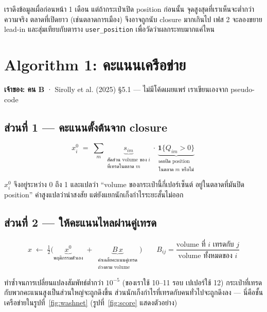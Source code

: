 \documentclass[11pt,a4paper]{article}
\newcommand{\en}[1]{#1}
\newcommand{\code}[1]{\texttt{#1}}
\newcommand{\stg}[2]{\textcolor{#1}{\textbf{\en{#2}}}}
\newcommand{\rB}{\stg{alg}{B}}
\begin{document}
\begin{warnbox}[title={ข้อจำกัดที่ต้องพูดตรง ๆ: position ก่อนหน้าต่างเวลาเราไม่รู้}]
เราดึงข้อมูลเผื่อก่อนหน้า 1 เดือน แต่ถ้ากระเป๋าเปิด position ก่อนนั้น
จุดสูงสุดที่เราเห็นจะต่ำกว่าความจริง ตลาดที่เปิดยาว (เช่นตลาดการเมือง)
จึงอาจถูกนับ closure มากเกินไป เฟส 2 จะลองขยาย lead-in
และสุ่มเทียบกับตาราง \code{user\_position} เพื่อวัดว่าผลกระทบมากแค่ไหน
\end{warnbox}

\section{Algorithm 1: คะแนนเครือข่าย}
\label{sec:alg}

\textbf{เจ้าของ: คน \rB} · Sirolly et al. (2025) §5.1 --- ไม่มีโค้ดเผยแพร่ เราเขียนเองจาก pseudo-code

\subsection{ส่วนที่ 1 --- คะแนนตั้งต้นจาก closure}

\begin{equation}
x^{0}_i \;=\; \sum_{m}
\underbrace{s_{im}}_{\substack{\text{สัดส่วน volume ของ } i\\ \text{ที่เทรดในตลาด } m}}
\cdot
\underbrace{\mathbf{1}\{Q_{im} > 0\}}_{\substack{\text{เคยปิด position}\\ \text{ในตลาด } m \text{ หรือไม่}}}
\end{equation}

$x^0_i$ จึงอยู่ระหว่าง 0 ถึง 1 และแปลว่า ``volume ของกระเป๋านี้กี่เปอร์เซ็นต์
อยู่ในตลาดที่มันปิด position'' ค่าสูงแปลว่าน่าสงสัย แต่ยังแยกนักเก็งกำไรระยะสั้นไม่ออก

\subsection{ส่วนที่ 2 --- ให้คะแนนไหลผ่านคู่เทรด}

\begin{equation}
x \;\leftarrow\; \tfrac{1}{2}\Big(
\underbrace{x^{0}}_{\text{พฤติกรรมตัวเอง}}
\;+\;
\underbrace{B\,x}_{\substack{\text{ค่าเฉลี่ยคะแนนคู่เทรด}\\ \text{ถ่วงตาม volume}}}
\Big)
\qquad
B_{ij} = \frac{\text{volume ที่ } i \text{ เทรดกับ } j}{\text{volume ทั้งหมดของ } i}
\end{equation}

ทำซ้ำจนการเปลี่ยนแปลงสัมพัทธ์ต่ำกว่า $10^{-5}$ (ของเราใช้ 10--11 รอบ เปเปอร์ใช้ 12)
กระเป๋าที่เทรดกับพวกคะแนนสูงเป็นส่วนใหญ่จะถูกดึงขึ้น
ส่วนนักเก็งกำไรที่เทรดกับคนทั่วไปจะถูกดึงลง --- นี่คือชั้นเครือข่ายในรูปที่~\ref{fig:washnet} (รูปที่~\ref{fig:score} แสดงตัวอย่าง)
\end{document}
